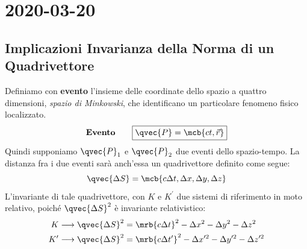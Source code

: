 \chapter{2020-03-20}
\section{Implicazioni Invarianza della Norma di un Quadrivettore}
Definiamo con \textbf{evento} l'insieme delle coordinate dello spazio a quattro
dimensioni, \textit{spazio di Minkowski}, che identificano un particolare
fenomeno fisico localizzato.
\begin{align}
  \textbf{Evento} \qquad \boxed{\qvec{P} = \mcb{ct,\vec{r}}}
\end{align}
Quindi supponiamo $\qvec{P}_1$ e $\qvec{P}_2$ due eventi dello spazio-tempo. La
distanza fra i due eventi sarà anch'essa un quadrivettore definito come segue:
\begin{equation}
  \qvec{\Delta S} = \mcb{c\Delta t, \Delta x, \Delta y, \Delta z}
\end{equation}
L'invariante di tale quadrivettore, con $K$ e $K^\prime$ due sistemi di
riferimento in moto relativo, poiché $\qvec{\Delta S}^2$ è invariante
relativistico:
\begin{align}
  K \longrightarrow \qvec{\Delta S}^2 &= \mrb{c \Delta t}^2 - \Delta x^2 -
  \Delta y^2 - \Delta z^2
  \\
  K^\prime \longrightarrow \qvec{\Delta S}^2 &= \mrb{c \Delta t^\prime}^2 -
  \Delta x^{\prime 2} - \Delta y^{\prime 2} - \Delta z^{\prime 2}
\end{align}

